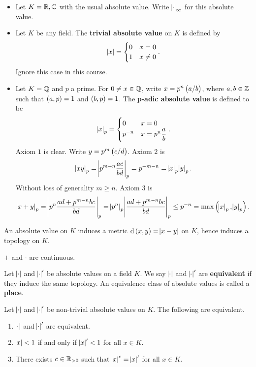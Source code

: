 \begin{example*}
\hfill
\begin{itemize}
\item Let $ K = \mathbb{R}, \mathbb{C} $ with the usual absolute value. Write $ \abs{\cdot}_\infty $ for this absolute value.
\item Let $ K $ be any field. The \textbf{trivial absolute value} on $ K $ is defined by
$$ \abs{x} =
\begin{cases}
0 & x = 0 \\
1 & x \ne 0
\end{cases}.
$$
Ignore this case in this course.
\item Let $ K = \mathbb{Q} $ and $ p $ a prime. For $ 0 \ne x \in \mathbb{Q} $, write $ x = p^n\br{a / b} $, where $ a, b \in \mathbb{Z} $ such that $ \br{a, p} = 1 $ and $ \br{b, p} = 1 $. The \textbf{p-adic absolute value} is defined to be
$$ \abs{x}_p =
\begin{cases}
0 & x = 0 \\
p^{-n} & x = p^n\dfrac{a}{b}
\end{cases}.
$$
Axiom $ 1 $ is clear. Write $ y = p^m\br{c / d} $. Axiom $ 2 $ is
$$ \abs{xy}_p = \abs{p^{m + n}\dfrac{ac}{bd}}_p = p^{-m - n} = \abs{x}_p\abs{y}_p. $$
Without loss of generality $ m \ge n $. Axiom $ 3 $ is
$$ \abs{x + y}_p = \abs{p^n\dfrac{ad + p^{m - n}bc}{bd}}_p = \abs{p^n}_p\abs{\dfrac{ad + p^{m - n}bc}{bd}}_p \le p^{-n} = \max\br{\abs{x}_p, \abs{y}_p}. $$
\end{itemize}
\end{example*}

An absolute value on $ K $ induces a metric $ \d\br{x, y} = \abs{x - y} $ on $ K $, hence induces a topology on $ K $.

\begin{exercise*}
$ + $ and $ \cdot $ are continuous.
\end{exercise*}

\begin{definition}
Let $ \abs{\cdot} $ and $ \abs{\cdot}' $ be absolute values on a field $ K $. We say $ \abs{\cdot} $ and $ \abs{\cdot}' $ are \textbf{equivalent} if they induce the same topology. An equivalence class of absolute values is called a \textbf{place}.
\end{definition}

\pagebreak

\begin{proposition}
Let $ \abs{\cdot} $ and $ \abs{\cdot}' $ be non-trivial absolute values on $ K $. The following are equivalent.
\begin{enumerate}
\item $ \abs{\cdot} $ and $ \abs{\cdot}' $ are equivalent.
\item $ \abs{x} < 1 $ if and only if $ \abs{x}' < 1 $ for all $ x \in K $.
\item There exists $ c \in \mathbb{R}_{> 0} $ such that $ \abs{x}^c = \abs{x}' $ for all $ x \in K $.
\end{enumerate}
\end{proposition}

